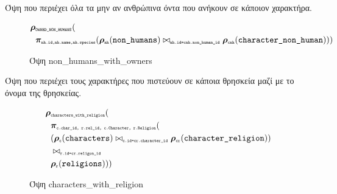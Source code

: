 \documentclass[../main.tex]{subfiles}
\begin{document}
\noindent
Όψη που περιέχει όλα τα μην αν ανθρώπινα όντα που ανήκουν σε κάποιον
χαρακτήρα.
\begin{figure}[H]
  \begin{equation}
    \begin{aligned}
      \bm{\rho}&_{\texttt{\tiny OWNED\_NON\_HUMANS}} ( \\
               & \bm{\pi}_{\texttt{\tiny nh.id,nh.name,nh.species}} (
               \bm{\rho}_{\texttt{\tiny nh}}(\texttt{non\_humans})
               \bowtie_{\texttt{\tiny nh.id=cnh.non\_human\_id}}
               \bm{\rho}_{\texttt{\tiny cnh}}(\texttt{character\_non\_human})
               ))
    \end{aligned}
  \end{equation}
  \caption{Όψη non\_humans\_with\_owners}
\end{figure}

\noindent
Όψη που περιέχει τους χαρακτήρες που πιστεύουν σε κάποια θρησκεία μαζί με το
όνομα της θρησκείας.
\begin{figure}[H]
  \begin{equation}
    \begin{aligned}
      \bm{\rho}&_{\texttt{\tiny characters\_with\_religion}} ( \\
        & \bm{\pi}_{\texttt{\tiny c.char\_id, r.rel\_id, c.Character, r.Religion}} ( \\
        & (\bm{\rho}_{\texttt{\tiny c}}(\texttt{characters})
        \bowtie_{\texttt{\tiny c.id=cr.character\_id}}
        \bm{\rho}_{\texttt{\tiny cr}}(\texttt{character\_religion})
        ) \\
        & \bowtie_{\texttt{\tiny r.id=cr.religon\_id}} \\
        & \bm{\rho}_{\texttt{\tiny r}}(\texttt{religions})))
    \end{aligned}
  \end{equation}
  \caption{Όψη characters\_with\_religion}
\end{figure}
\end{document}
